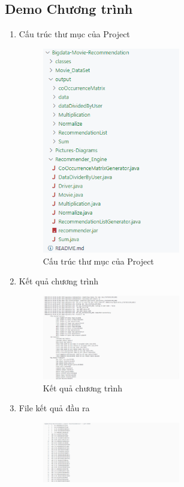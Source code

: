 \documentclass{report}
\begin{document}
\subsection*{Demo Chương trình}
\begin{enumerate}
    \item Cấu trúc thư mục của Project
          \begin{figure}[h]
              \centering
              \includegraphics[width=6cm]{images/Demo2.png}
              \caption{Cấu trúc thư mục của Project}
          \end{figure}
    \item Kết quả chương trình
          \begin{figure}[ht]
              \centering
              \includegraphics[width=6cm]{images/Demo3.png}
              \caption{Kết quả chương trình}
          \end{figure}
          \pagebreak
    \item File kết quả đầu ra
          \begin{figure}[ht]
              \centering
              \includegraphics[width=6cm]{images/Demo4.png}

\end{figure}
\end{enumerate}
\end{document}
